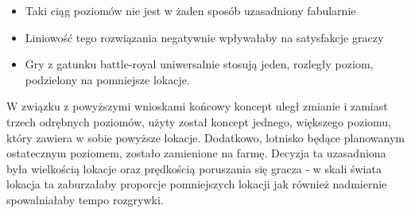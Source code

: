     \begin{itemize}
        \item Taki ciąg poziomów nie jest w żaden sposób uzasadniony fabularnie
        \item Liniowość tego rozwiązania negatywnie wpływałaby na satysfakcje graczy
        \item Gry z gatunku battle-royal uniwersalnie stosują jeden, rozległy poziom, podzielony na pomniejsze lokacje.
    \end{itemize}
W związku z powyższymi wnioskami końcowy koncept uległ zmianie i zamiast trzech odrębnych poziomów, użyty został koncept jednego, większego poziomu, który zawiera w sobie powyższe lokacje.
Dodatkowo, lotnisko będące planowanym ostatecznym poziomem, zostało zamienione na farmę.
Decyzja ta uzasadniona była wielkością lokacje oraz prędkością poruszania się gracza - w skali świata lokacja ta zaburzałaby proporcje pomniejszych lokacji jak również nadmiernie spowalniałaby tempo rozgrywki.

    
